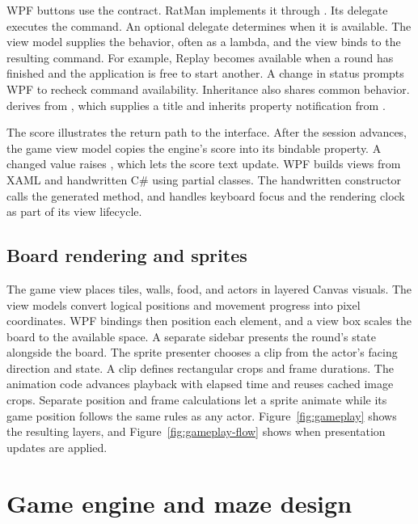 WPF buttons use the  contract. RatMan implements it through . Its  delegate executes the command. An optional  delegate determines when it is available. The view model supplies the behavior, often as a lambda, and the view binds to the resulting command. For example, Replay becomes available when a round has finished and the application is free to start another. A change in status prompts WPF to recheck command availability. Inheritance also shares common behavior.  derives from , which supplies a title and inherits property notification from .

The score illustrates the return path to the interface. After the session advances, the game view model copies the engine's score into its bindable property. A changed value raises , which lets the score text update. WPF builds views from XAML and handwritten C\# using partial classes. The handwritten constructor calls the generated  method, and  handles keyboard focus and the rendering clock as part of its view lifecycle.

\subsection{Board rendering and sprites}

The game view places tiles, walls, food, and actors in layered Canvas visuals. The view models convert logical positions and movement progress into pixel coordinates. WPF bindings then position each element, and a view box scales the board to the available space. A separate sidebar presents the round's state alongside the board. The sprite presenter chooses a clip from the actor's facing direction and state. A clip defines rectangular crops and frame durations. The animation code advances playback with elapsed time and reuses cached image crops. Separate position and frame calculations let a sprite animate while its game position follows the same rules as any actor. Figure~\ref{fig:gameplay} shows the resulting layers, and Figure~\ref{fig:gameplay-flow} shows when presentation updates are applied.

\clearpage
\section{Game engine and maze design}

